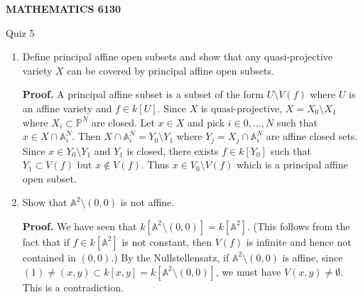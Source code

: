 \documentclass[12pt]{amsart}
\begin{document}
\bigskip\bigskip\bigskip\bigskip
\centerline{\bf MATHEMATICS 6130}
\centerline{Quiz 5}
\begin{enumerate}
\item  Define principal affine open subsets and show that any quasi-projective variety $X$ can be covered by  principal affine open subsets.

{\bf Proof.} A principal affine subset is a subset of the form $U\setminus V(f)$ where $U$ is an affine variety and $f\in k[U]$.
Since $X$ is quasi-projective, $X=X_0\setminus X_1$ where $X_i\subset \mathbb P ^N$ are closed. Let $x\in X$ and pick $i\in 0,\ldots , N$ such that $x\in X\cap \mathbb A ^N_i$. Then  $X\cap \mathbb A ^N_i=Y_0\setminus Y_1$ where $Y_j=X_j \cap \mathbb A ^N_i$ are affine closed sets.
Since $x\in Y_0\setminus Y_1$ and $Y_1$ is closed, there exists $f\in k[Y_0]$ such that $Y_1\subset V(f)$ but $x\not\in V(f)$. Thus $x\in V_0\setminus V(f)$ which is a principal affine open subset.

\item Show that $\mathbb A ^2\setminus (0,0)$ is not affine.


{\bf Proof.} We have seen that $k[\mathbb A ^2\setminus (0,0)] =k[\mathbb A ^2]$. (This follows from the fact that if $f\in k[\mathbb A ^2]$ is not constant, then $V(f)$ is infinite and hence not contained in $(0,0)$.)
By the Nullstellensatz, if $\mathbb A ^2\setminus (0,0)$ is affine, 
since $(1)\ne (x,y)\subset k[x,y]=k[\mathbb A ^2\setminus (0,0)] $, we must have $V(x,y)\ne \emptyset$. This is a contradiction.

\end{enumerate}
\end{document}
